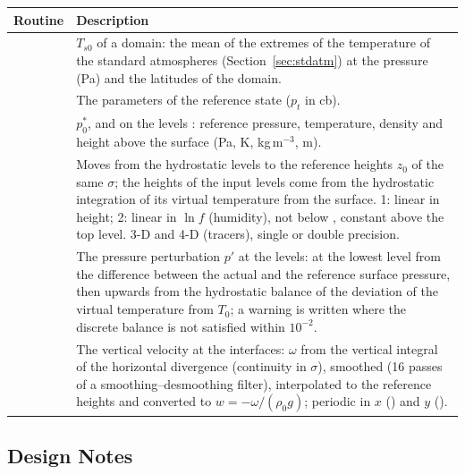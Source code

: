 \begin{longtable}{L{5.6cm} L{8.4cm}}
  \toprule
  \textbf{Routine} & \textbf{Description} \\
  \midrule
  \endhead
  \bottomrule
  \endfoot
   &
    $T_{s0}$ of a domain: the mean of the extremes of the temperature of
    the standard atmospheres (Section~\ref{sec:stdatm}) at the pressure
     (Pa) and the latitudes of the domain. \\
   &
    The parameters of the reference state ($p_t$ in cb). \\
   &
    $p^*_0$, and on the levels : reference pressure,
    temperature, density and height above the surface (Pa, K,
    kg\,m$^{-3}$, m). \\
   &
    Moves  from the hydrostatic levels to the reference heights
    $z_0$ of the same $\sigma$; the heights of the input levels come from
    the hydrostatic integration of its virtual temperature  from
    the surface.  1: linear in height; 2: linear in
    $\ln f$ (humidity), not below , constant above the top
    level. 3-D and 4-D (tracers), single or double precision. \\
   &
    The pressure perturbation $p'$ at the levels: at the lowest level from
    the difference between the actual and the reference surface pressure,
    then upwards from the hydrostatic balance of the deviation of the
    virtual temperature from $T_0$; a warning is written where the
    discrete balance is not satisfied within $10^{-2}$. \\
   &
    The vertical velocity at the interfaces: $\omega$ from the vertical
    integral of the horizontal divergence (continuity in $\sigma$), smoothed
    (16 passes of a smoothing--desmoothing filter), interpolated to the
    reference heights and converted to $w = -\omega/(\rho_0 g)$; periodic
    in $x$ () and $y$ (). \\
\end{longtable}

\subsection{Design Notes}

